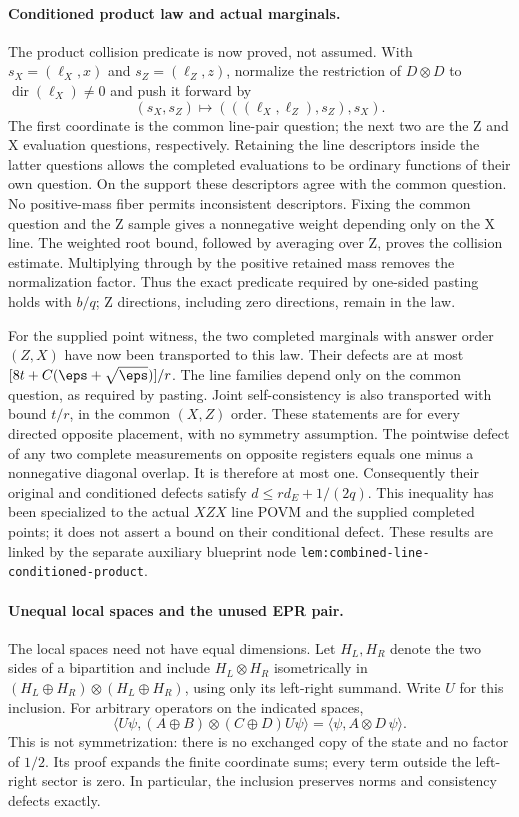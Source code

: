 \documentclass[11pt]{article}
\begin{document}
\paragraph{Conditioned product law and actual marginals.}
The product collision predicate is now proved, not assumed. With
$s_X=(\ell_X,x)$ and $s_Z=(\ell_Z,z)$, normalize the restriction of
$D\otimes D$ to $\operatorname{dir}(\ell_X)\ne0$ and push it forward by
\[
 (s_X,s_Z)\longmapsto (((\ell_X,\ell_Z),s_Z),s_X).
\]
The first coordinate is the common line-pair question; the next two are the
Z and X evaluation questions, respectively. Retaining the line descriptors
inside the latter questions allows the completed evaluations to be ordinary
functions of their own question. On the support these descriptors agree
with the common question. No positive-mass fiber permits inconsistent
descriptors. Fixing the common question and the Z sample gives a
nonnegative weight depending only on the X line. The weighted root bound,
followed by averaging over Z, proves the collision estimate. Multiplying
through by the positive retained mass removes the normalization factor.
Thus the exact predicate required by one-sided pasting holds with $b/q$;
Z directions, including zero directions, remain in the law.

For the supplied point witness, the two completed marginals with answer
order $(Z,X)$ have now been transported to this law. Their defects are at
most $[8t+C(\eps+\sqrt\eps)]/r$. The line families depend only on the
common question, as required by pasting. Joint self-consistency is also
transported with bound $t/r$, in the common $(X,Z)$ order. These statements
are for every directed opposite placement, with no symmetry assumption.
The pointwise defect of any two complete measurements on opposite registers
equals one minus a nonnegative diagonal overlap. It is therefore at most
one. Consequently their original and conditioned defects satisfy
$d\le r d_E+1/(2q)$. This inequality has been specialized to the actual
$XZX$ line POVM and the supplied completed points; it does not assert a
bound on their conditional defect. These results are linked by the separate
auxiliary blueprint node \texttt{lem:combined-line-conditioned-product}.

\paragraph{Unequal local spaces and the unused EPR pair.}
The local spaces need not have equal dimensions. Let $H_L,H_R$ denote the
two sides of a bipartition and include $H_L\otimes H_R$ isometrically in
$(H_L\oplus H_R)\otimes(H_L\oplus H_R)$, using only its left-right
summand. Write $U$ for this inclusion. For arbitrary operators on the
indicated spaces,
\[
 \langle U\psi,(A\oplus B)\otimes(C\oplus D)U\psi\rangle
   =\langle\psi,A\otimes D\,\psi\rangle.
\]
This is not symmetrization: there is no exchanged copy of the state and no
factor of $1/2$. Its proof expands the finite coordinate sums; every term
outside the left-right sector is zero. In particular, the inclusion
preserves norms and consistency defects exactly.
\end{document}

